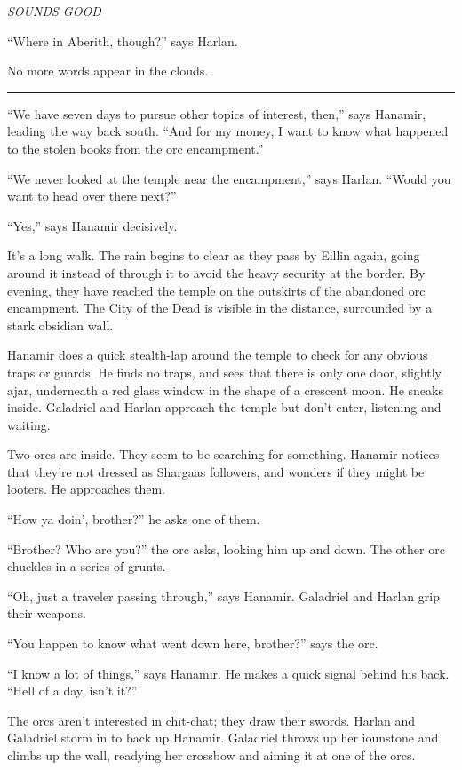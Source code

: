 \documentclass[smalldemyvopaper,11pt,twoside,onecolumn,openright,extrafontsizes]{memoir}
\begin{document}
\emph{SOUNDS GOOD}

``Where in Aberith, though?'' says Harlan.

No more words appear in the clouds.

\begin{center}\rule{0.5\linewidth}{\linethickness}\end{center}

``We have seven days to pursue other topics of interest, then,'' says
Hanamir, leading the way back south. ``And for my money, I want to know
what happened to the stolen books from the orc encampment.''

``We never looked at the temple near the encampment,'' says Harlan.
``Would you want to head over there next?''

``Yes,'' says Hanamir decisively.

It's a long walk. The rain begins to clear as they pass by Eillin again,
going around it instead of through it to avoid the heavy security at the
border. By evening, they have reached the temple on the outskirts of the
abandoned orc encampment. The City of the Dead is visible in the
distance, surrounded by a stark obsidian wall.

Hanamir does a quick stealth-lap around the temple to check for any
obvious traps or guards. He finds no traps, and sees that there is only
one door, slightly ajar, underneath a red glass window in the shape of a
crescent moon. He sneaks inside. Galadriel and Harlan approach the
temple but don't enter, listening and waiting.

Two orcs are inside. They seem to be searching for something. Hanamir
notices that they're not dressed as Shargaas followers, and wonders if
they might be looters. He approaches them.

``How ya doin', brother?'' he asks one of them.

``Brother? Who are you?'' the orc asks, looking him up and down. The
other orc chuckles in a series of grunts.

``Oh, just a traveler passing through,'' says Hanamir. Galadriel and
Harlan grip their weapons.

``You happen to know what went down here, brother?'' says the orc.

``I know a lot of things,'' says Hanamir. He makes a quick signal behind
his back. ``Hell of a day, isn't it?''

The orcs aren't interested in chit-chat; they draw their swords. Harlan
and Galadriel storm in to back up Hanamir. Galadriel throws up her
iounstone and climbs up the wall, readying her crossbow and aiming it at
one of the orcs.
\end{document}
